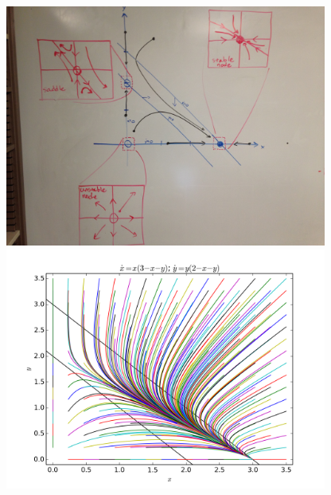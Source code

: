 \documentclass[12pt]{article}
\begin{document}
\begin{figure}[ht]
    \centering
    \includegraphics[width=400px]{figures/4_drawing.jpg}
    \includegraphics[width=400px]{figures/4_simulation.png}
\end{figure}
\end{document}
